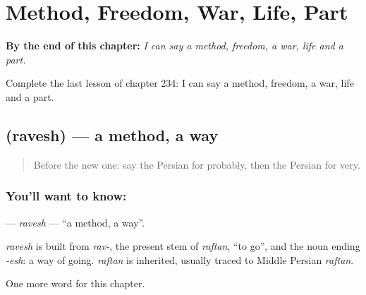
\chapter{Method, Freedom, War, Life, Part}
\label{ch:fa-method-freedom-war-life-part}

\begin{chapteropening}
\textbf{By the end of this chapter:} \emph{I can say a method, freedom, a war, life and a part.}

Complete the last lesson of chapter 234: I can say a method, freedom, a war, life and a part.
\end{chapteropening}

\section[\texorpdfstring{\fa{روش} (ravesh)}{روش (ravesh)}]{ (ravesh) — a method, a way}

\label{lesson:FA-C234-ravesh}



\begin{quote}
Before the new one: say the Persian for probably, then the Persian for very.
\end{quote}

\subsection*{You'll want to know: }
\textbf{} — \emph{ravesh} — \textquotedblleft{}a method, a way\textquotedblright{}.

\begin{cousinweb}
\emph{ravesh} is built from \emph{rav-}, the present stem of \emph{raftan}, \textquotedblleft{}to go\textquotedblright{}, and the noun ending \emph{-esh}: a way of going. \emph{raftan} is inherited, usually traced to Middle Persian \emph{raftan}.
\end{cousinweb}

\begin{grammarlens}[title={What you've built}]
One more word for this chapter.
\end{grammarlens}


